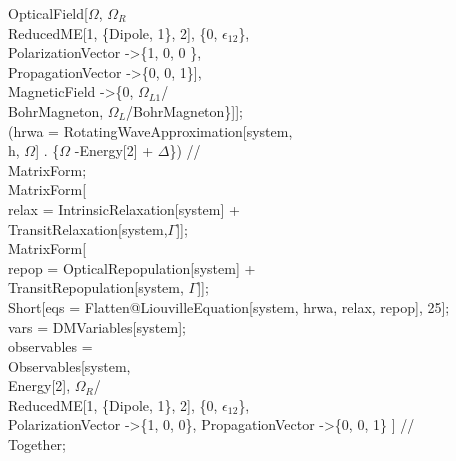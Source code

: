      OpticalField[$\Omega$, $\Omega_R$ \\
       ReducedME[1, \{Dipole, 1\}, 2], \{0, $\epsilon_{12}$\}, \\
      PolarizationVector -\textgreater \{1, 0, 0 \}, \\
      PropagationVector -\textgreater \{0, 0, 1\}], \\
    MagneticField -\textgreater \{0, $\Omega_{L1}$/ \\
       BohrMagneton, $\Omega_L$/BohrMagneton\}]]; \\
(hrwa = RotatingWaveApproximation[system, \\
      h, $\Omega$] . \{$\Omega$ -\rbrack Energy[2] + $\Delta$\}) // \\
  MatrixForm; \\
MatrixForm[ \\
  relax = IntrinsicRelaxation[system] + \\
    TransitRelaxation[system,$\Gamma$]];\\
MatrixForm[\\
  repop = OpticalRepopulation[system] + \\
    TransitRepopulation[system, $\Gamma$]];\\
Short[eqs = Flatten@LiouvilleEquation[system, hrwa, relax, repop], 25];\\
vars = DMVariables[system];\\
observables = \\
  Observables[system, \\
    Energy[2], $\Omega_R$/ \\
     ReducedME[1, \{Dipole, 1\}, 2], \{0, $\epsilon_{12}$\}, \\
    PolarizationVector -\textgreater \{1, 0, 0\}, PropagationVector -\textgreater \{0, 0, 1\} ] // \\
    Together;\\

